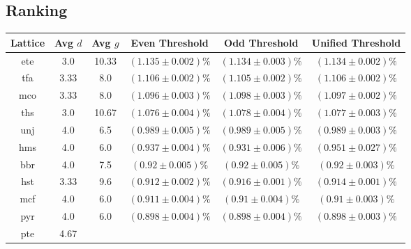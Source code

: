 \documentclass[pra]{revtex4-1}
\begin{document}
\begin{center}
\subsection*{Ranking}
\begin{tabular}{|c|c|c|c|c|c|} \hline \bf Lattice & \bf Avg $d$ & \bf Avg $g$ & \bf Even Threshold & \bf Odd Threshold  & \bf Unified Threshold \\ \hline
\hline 
\color{blue}
ete &
\color{blue}
3.0 &
\color{blue}
10.33 &
\color{blue}
 $(1.135 \pm 0.002)\% $& 
\color{blue}
$(1.134 \pm 0.003)\% $ &
\color{blue}
$(1.134 \pm 0.002)\% $ \\
\color{blue}
tfa &
\color{blue}
3.33 &
\color{blue}
8.0 &
\color{blue}
 $(1.106 \pm 0.002)\% $& 
\color{blue}
$(1.105 \pm 0.002)\% $ &
\color{blue}
$(1.106 \pm 0.002)\% $ \\
\color{blue}
mco &
\color{blue}
3.33 &
\color{blue}
8.0 &
\color{blue}
 $(1.096 \pm 0.003)\% $& 
\color{blue}
$(1.098 \pm 0.003)\% $ &
\color{blue}
$(1.097 \pm 0.002)\% $ \\
\color{blue}
ths &
\color{blue}
3.0 &
\color{blue}
10.67 &
\color{blue}
 $(1.076 \pm 0.004)\% $& 
\color{blue}
$(1.078 \pm 0.004)\% $ &
\color{blue}
$(1.077 \pm 0.003)\% $ \\
\hline 
\color{blue}
unj &
\color{blue}
4.0 &
\color{blue}
6.5 &
\color{blue}
 $(0.989 \pm 0.005)\% $& 
\color{blue}
$(0.989 \pm 0.005)\% $ &
\color{blue}
$(0.989 \pm 0.003)\% $ \\
\color{blue}
hms &
\color{blue}
4.0 &
\color{blue}
6.0 &
\color{blue}
 $(0.937 \pm 0.004)\% $& 
\color{blue}
$(0.931 \pm 0.006)\% $ &
\color{blue}
$(0.951 \pm 0.027)\% $ \\
\color{blue}
bbr &
\color{blue}
4.0 &
\color{blue}
7.5 &
\color{blue}
 $(0.92 \pm 0.005)\% $& 
\color{blue}
$(0.92 \pm 0.005)\% $ &
\color{blue}
$(0.92 \pm 0.003)\% $ \\
\color{red}
hst &
\color{red}
3.33 &
\color{red}
9.6 &
\color{red}
 $(0.912 \pm 0.002)\% $& 
\color{red}
$(0.916 \pm 0.001)\% $ &
\color{red}
$(0.914 \pm 0.001)\% $ \\
\color{blue}
mcf &
\color{blue}
4.0 &
\color{blue}
6.0 &
\color{blue}
 $(0.911 \pm 0.004)\% $& 
\color{blue}
$(0.91 \pm 0.004)\% $ &
\color{blue}
$(0.91 \pm 0.003)\% $ \\
\color{blue}
pyr &
\color{blue}
4.0 &
\color{blue}
6.0 &
\color{blue}
 $(0.898 \pm 0.004)\% $& 
\color{blue}
$(0.898 \pm 0.004)\% $ &
\color{blue}
$(0.898 \pm 0.003)\% $ \\
\color{blue}
pte &
\color{blue}
4.67 &
\color{blue}

\end{tabular}
\end{center}
\end{document}
